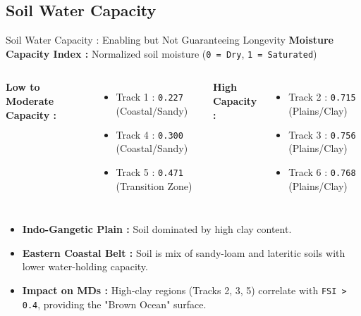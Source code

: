 \documentclass[8pt, aspectratio=169]{beamer}
\begin{document}
\subsection{Soil Water Capacity}
\begin{frame}{Soil Water Capacity : Enabling but Not Guaranteeing Longevity}
    \textbf{Moisture Capacity Index :} Normalized soil moisture (\texttt{0 = Dry}, \texttt{1 = Saturated})

    \vspace{0.2cm}
    \footnotesize
    \begin{columns}[T]
        \textbf{Low to Moderate Capacity :}
        \begin{itemize}
            \item Track 1 : \texttt{0.227} (Coastal/Sandy)
            \item Track 4 : \texttt{0.300} (Coastal/Sandy)
            \item Track 5 : \texttt{0.471} (Transition Zone)
        \end{itemize}

        \textbf{High Capacity :}
        \begin{itemize}
            \item Track 2 : \texttt{0.715} (Plains/Clay)
            \item Track 3 : \texttt{0.756} (Plains/Clay)
            \item Track 6 : \texttt{0.768} (Plains/Clay)
        \end{itemize}
    \end{columns}

    \vspace{0.3cm}
    \begin{itemize}
        \item \textbf{Indo-Gangetic Plain :} Soil dominated by  high clay content.
        \item \textbf{Eastern Coastal Belt :} Soil is mix of sandy-loam and lateritic soils with lower water-holding capacity.
        \item \textbf{Impact on MDs :} High-clay regions (Tracks 2, 3, 5) correlate with \texttt{FSI > 0.4}, providing the "Brown Ocean" surface.
    \end{itemize}


\end{frame}
\end{document}
